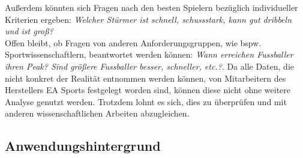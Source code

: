 \documentclass[usegeometry=true]{scrartcl}
\begin{document}
Außerdem könnten sich Fragen nach den besten Spielern bezüglich individueller Kriterien ergeben: \textit{Welcher Stürmer ist schnell, schussstark, kann gut dribbeln und ist groß?}\\
Offen bleibt, ob Fragen von anderen Anforderungsgruppen, wie bspw. Sportwissenschaftlern, beantwortet werden können: \textit{Wann erreichen Fussballer ihren Peak? Sind größere Fussballer besser, schneller, etc.?}. Da alle Daten, die nicht konkret der Realität entnommen werden können, von Mitarbeitern des Herstellers EA Sports festgelegt worden sind, können diese nicht ohne weitere Analyse genutzt werden. Trotzdem lohnt es sich, dies zu überprüfen und mit anderen wissenschaftlichen Arbeiten abzugleichen.

\newpage


\subsection{Anwendungshintergrund}
\end{document}

